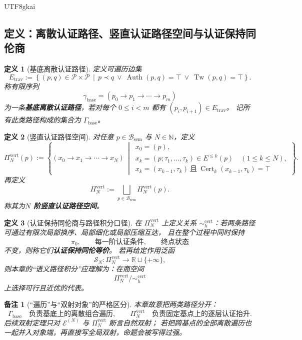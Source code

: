 \documentclass[12pt]{article}
\newtheorem{definition}{定义}[section]
\newtheorem{remark}{备注}[section]
\newcommand{\NN}{\mathbb{N}}
\newcommand{\Tw}{\operatorname{Tw}}
\newcommand{\Cert}{\operatorname{Cert}}
\newcommand{\Auth}{\operatorname{Auth}}
\begin{document}
\begin{CJK*}{UTF8}{gkai}
\subsection{定义：离散认证路径、竖直认证路径空间与认证保持同伦商}
\label{subsec:tex37-ch13-paths}

\begin{definition}[基底离散认证路径]
\label{def:tex37-ch13-base-path}
定义可遍历边集
\[
  E_{\mathrm{trav}}
  :=
  \left\{
    (p,q)\in\mathcal P\times\mathcal P
    \,\middle|\,
    p\prec q\ \vee\ \Auth(p,q)=\top\ \vee\ \Tw(p,q)=\top
  \right\}.
\]
称有限序列
\[
  \gamma_{\mathrm{base}}=(p_0\to p_1\to \cdots\to p_m)
\]
为一条\textbf{基底离散认证路径}，若对每个 $0\le i<m$ 都有 $(p_i,p_{i+1})\in E_{\mathrm{trav}}$。
记所有此类路径构成的集合为 $\Gamma_{\mathrm{base}}$。
\end{definition}

\begin{definition}[竖直认证路径空间]
\label{def:tex37-ch13-vertical-path}
对任意 $p\in\mathcal B_{\mathrm{sem}}$ 与 $N\in\NN$，定义
\[
  \Pi_N^{\mathrm{vert}}(p)
  :=
  \left\{
    (x_0\to x_1\to \cdots \to x_N)
    \,\middle|\,
    \begin{array}{l}
      x_0=(p),\\
      x_k=(p;\tau_1,\dots,\tau_k)\in E^{\le k}(p)\quad (1\le k\le N),\\
      x_k=(x_{k-1},\tau_k)\ \text{且}\ \Cert_k(x_{k-1},\tau_k)=\top
    \end{array}
  \right\}.
\]
再定义
\[
  \Pi_N^{\mathrm{vert}}
  :=
  \bigsqcup_{p\in\mathcal B_{\mathrm{sem}}}\Pi_N^{\mathrm{vert}}(p).
\]
称其为\textbf{$N$ 阶竖直认证路径空间}。
\end{definition}

\begin{definition}[认证保持同伦商与路径积分口径]
\label{def:tex37-ch13-homotopy-quotient}
在 $\Pi_N^{\mathrm{vert}}$ 上定义关系 $\sim_h^{\mathrm{cert}}$：若两条路径可通过有限次局部换序、局部细化或局部压缩互达，
且在整个过程中同时保持
\[
  \pi_0,\qquad
  \text{每一阶认证条件},\qquad
  \text{终点状态}
\]
不变，则称它们\textbf{认证保持同伦等价}。
若再给定作用泛函
\[
  \mathcal S_N:\Pi_N^{\mathrm{vert}}\to \mathbb{R}\sqcup\{+\infty\},
\]
则本章的“语义路径积分”应理解为：在商空间
\[
  \Pi_N^{\mathrm{vert}}/\!\sim_h^{\mathrm{cert}}
\]
上选择可行且近优的代表。
\end{definition}

\begin{remark}[“遍历”与“双射对象”的严格区分]
\label{rem:tex37-ch13-path-distinction}
本章故意把两类路径分开：
\[
  \Gamma_{\mathrm{base}}
  \quad\text{负责基底上的离散组合遍历},\qquad
  \Pi_N^{\mathrm{vert}}
  \quad\text{负责固定基点上的逐层认证抬升}.
\]
后续双射定理只对 $\mathcal E^{(N)}$ 与 $\Pi_N^{\mathrm{vert}}$ 断言自然双射；
若把跨基点的全部离散遍历也一起并入对象端，再直接写全局双射，命题会被写得过强。
\end{remark}


\end{CJK*}
\end{document}
